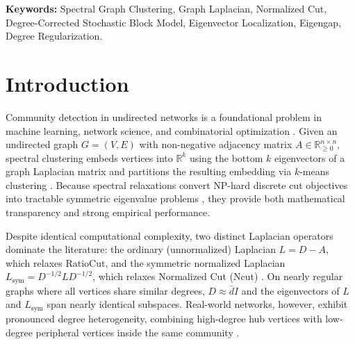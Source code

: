 \documentclass[10pt,twocolumn,a4paper]{article}
\begin{document}
\noindent\textbf{Keywords:} Spectral Graph Clustering, Graph Laplacian, Normalized Cut, Degree-Corrected Stochastic Block Model, Eigenvector Localization, Eigengap, Degree Regularization.

\section{Introduction}
Community detection in undirected networks is a foundational problem in machine learning, network science, and combinatorial optimization \cite{fortunato2010community,shi2000normalized}. Given an undirected graph $G = (V, E)$ with non-negative adjacency matrix $A \in \mathbb{R}_{\ge 0}^{n \times n}$, spectral clustering embeds vertices into $\mathbb{R}^k$ using the bottom $k$ eigenvectors of a graph Laplacian matrix and partitions the resulting embedding via $k$-means clustering \cite{ng2001spectral,vonluxburg2007tutorial}. Because spectral relaxations convert NP-hard discrete cut objectives into tractable symmetric eigenvalue problems \cite{fiedler1973algebraic,shi2000normalized}, they provide both mathematical transparency and strong empirical performance.

Despite identical computational complexity, two distinct Laplacian operators dominate the literature: the ordinary (unnormalized) Laplacian $L = D - A$, which relaxes RatioCut, and the symmetric normalized Laplacian $L_{\mathrm{sym}} = D^{-1/2} L D^{-1/2}$, which relaxes Normalized Cut (Ncut) \cite{shi2000normalized,vonluxburg2007tutorial}. On nearly regular graphs where all vertices share similar degrees, $D \approx \bar{d} I$ and the eigenvectors of $L$ and $L_{\mathrm{sym}}$ span nearly identical subspaces. Real-world networks, however, exhibit pronounced degree heterogeneity, combining high-degree hub vertices with low-degree peripheral vertices inside the same community \cite{karrer2011stochastic}.
\end{document}
